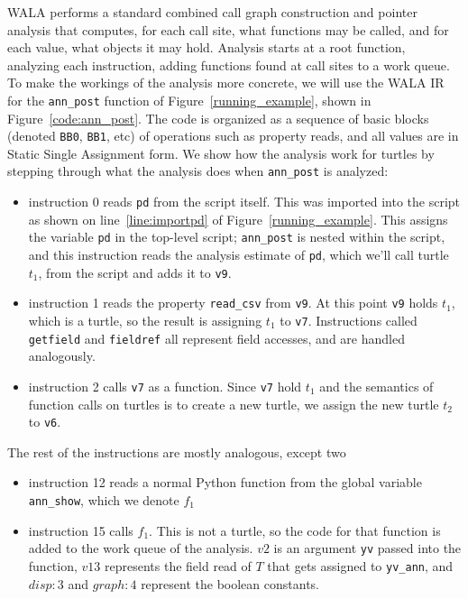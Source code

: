WALA performs a standard combined call graph construction and pointer analysis that computes, for each call site, what functions may be called, and for each value, what objects it may hold.  Analysis starts at a root function, analyzing each instruction, adding functions found at call sites to a work queue.  To make the workings of the analysis more concrete, we will use the WALA IR for the {\tt ann\_post} function of Figure~\ref{running_example}, shown in Figure~\ref{code:ann_post}.  The code is organized as a sequence of basic blocks (denoted {\tt BB0}, {\tt BB1}, etc) of operations such as property reads, and all values are in Static Single Assignment form.  We show how the analysis work for turtles by stepping through what the analysis does when {\tt ann\_post} is analyzed:
\begin{itemize}
\item instruction 0 reads {\tt pd} from the script itself.  This was imported into the script as shown on line~\ref{line:importpd} of Figure~\ref{running_example}.  This assigns the variable {\tt pd} in the top-level script; {\tt ann\_post} is nested within the script, and this instruction reads the analysis estimate of {\tt pd}, which we'll call turtle $t_1$, from the script and adds it to {\tt v9}. 
\item instruction 1 reads the property {\tt read\_csv} from {\tt v9}.  At this point {\tt v9} holds $t_1$, which is a turtle, so the result is assigning $t_1$ to {\tt v7}.  Instructions called {\tt getfield} and {\tt fieldref} all represent field accesses, and are handled analogously.
\item instruction 2 calls {\tt v7} as a function.  Since {\tt v7} hold $t_1$ and the semantics of function calls on turtles is to create a new turtle, we assign the new turtle $t_2$ to {\tt v6}.
\end{itemize} 
The rest of the instructions are mostly analogous, except two
\begin{itemize}
\item instruction 12 reads a normal Python function from the global variable {\tt ann\_show}, which we denote $f_1$
\item instruction 15 calls $f_1$.  This is not a turtle, so the code for that function is added to the work queue of the analysis.  $v2$ is an argument {\tt yv} passed into the function, $v13$ represents the field read of $T$ that gets assigned to {\tt yv\_ann}, and $disp:3$ and $graph:4$ represent the boolean constants.

\end{itemize}

